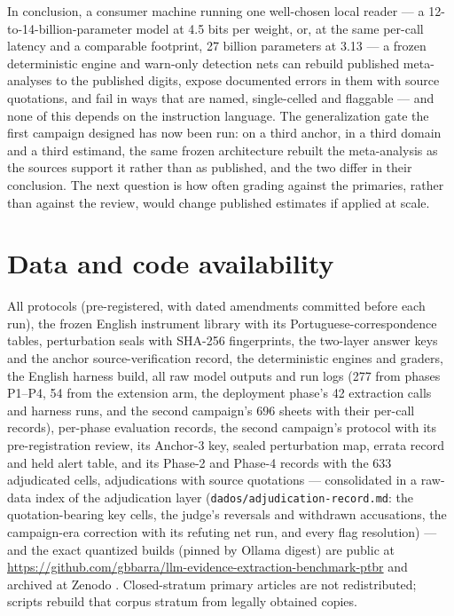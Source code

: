 \documentclass[11pt]{article}
\begin{document}
In conclusion, a consumer machine running one well-chosen local reader --- a 12-to-14-billion-parameter model at 4.5 bits per weight, or, at the same per-call latency and a comparable footprint, 27 billion parameters at 3.13 --- a frozen deterministic engine and warn-only detection nets can rebuild published meta-analyses to the published digits, expose documented errors in them with source quotations, and fail in ways that are named, single-celled and flaggable --- and none of this depends on the instruction language. The generalization gate the first campaign designed has now been run: on a third anchor, in a third domain and a third estimand, the same frozen architecture rebuilt the meta-analysis as the sources support it rather than as published, and the two differ in their conclusion. The next question is how often grading against the primaries, rather than against the review, would change published estimates if applied at scale.

\section*{Data and code availability}

All protocols (pre-registered, with dated amendments committed before each run), the frozen English instrument library with its Portuguese-correspondence tables, perturbation seals with SHA-256 fingerprints, the two-layer answer keys and the anchor source-verification record, the deterministic engines and graders, the English harness build, all raw model outputs and run logs (277 from phases P1--P4, 54 from the extension arm, the deployment phase's 42 extraction calls and harness runs, and the second campaign's 696 sheets with their per-call records), per-phase evaluation records, the second campaign's protocol with its pre-registration review, its Anchor-3 key, sealed perturbation map, errata record and held alert table, and its Phase-2 and Phase-4 records with the 633 adjudicated cells, adjudications with source quotations --- consolidated in a raw-data index of the adjudication layer (\texttt{dados/adjudication-record.md}: the quotation-bearing key cells, the judge's reversals and withdrawn accusations, the campaign-era correction with its refuting net run, and every flag resolution) --- and the exact quantized builds (pinned by Ollama digest) are public at \url{https://github.com/gbbarra/llm-evidence-extraction-benchmark-ptbr} and archived at Zenodo \citep{barra2026extrai}. Closed-stratum primary articles are not redistributed; scripts rebuild that corpus stratum from legally obtained copies.
\end{document}
